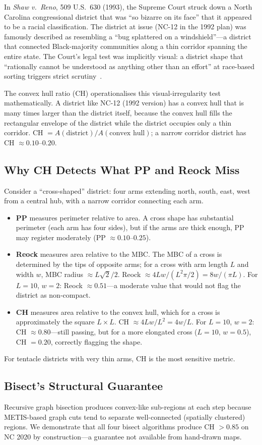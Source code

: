 In \textit{Shaw v.\ Reno}, 509 U.S.\ 630 (1993), the Supreme Court struck down
a North Carolina congressional district that was ``so bizarre on its face''
that it appeared to be a racial classification.
The district at issue (NC-12 in the 1992 plan) was famously described as
resembling a ``bug splattered on a windshield''---a district that connected
Black-majority communities along a thin corridor spanning the entire state.
The Court's legal test was implicitly visual: a district shape that ``rationally
cannot be understood as anything other than an effort'' at race-based sorting
triggers strict scrutiny~\citep{shaw1993}.

The convex hull ratio (CH) operationalises this visual-irregularity test
mathematically. A district like NC-12 (1992 version) has a convex hull that
is many times larger than the district itself, because the convex hull fills
the rectangular envelope of the district while the district occupies only a
thin corridor. CH $= A(\text{district}) / A(\text{convex hull})$; a narrow
corridor district has CH $\approx 0.10$--$0.20$.

\subsection{Why CH Detects What PP and Reock Miss}

Consider a ``cross-shaped'' district: four arms extending north, south, east, west
from a central hub, with a narrow corridor connecting each arm.
\begin{itemize}
  \item \textbf{PP} measures perimeter relative to area. A cross shape has
    substantial perimeter (each arm has four sides), but if the arms are
    thick enough, PP may register moderately (PP $\approx 0.10$--$0.25$).
  \item \textbf{Reock} measures area relative to the MBC. The MBC of a cross
    is determined by the tips of opposite arms; for a cross with arm length $L$
    and width $w$, MBC radius $\approx L\sqrt{2}/2$.
    Reock $\approx 4Lw / (L^2 \pi / 2) = 8w/(\pi L)$.
    For $L = 10$, $w = 2$: Reock $\approx 0.51$---a moderate value that
    would not flag the district as non-compact.
  \item \textbf{CH} measures area relative to the convex hull, which for a cross
    is approximately the square $L \times L$.
    CH $\approx 4Lw / L^2 = 4w/L$.
    For $L = 10$, $w = 2$: CH $\approx 0.80$---still passing, but for a more
    elongated cross ($L = 10$, $w = 0.5$), CH $= 0.20$, correctly flagging the shape.
\end{itemize}
For tentacle districts with very thin arms, CH is the most sensitive metric.

\subsection{Bisect's Structural Guarantee}

Recursive graph bisection produces convex-like sub-regions at each step because
METIS-based graph cuts tend to separate well-connected (spatially clustered)
regions. We demonstrate that all four bisect algorithms produce CH $> 0.85$
on NC 2020 by construction---a guarantee not available from hand-drawn maps.
